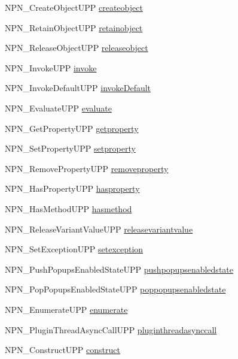 \begin{DoxyCompactItemize}
NPN\_\-CreateObjectUPP \hyperlink{struct___n_p_netscape_funcs_a92e8a72c044a7118346d278c74c5d5f7}{createobject}
\item 
NPN\_\-RetainObjectUPP \hyperlink{struct___n_p_netscape_funcs_a8bfc6725884dc636d136276a5514f972}{retainobject}
\item 
NPN\_\-ReleaseObjectUPP \hyperlink{struct___n_p_netscape_funcs_a54de30bc5da955596a5d9b7e906ec379}{releaseobject}
\item 
NPN\_\-InvokeUPP \hyperlink{struct___n_p_netscape_funcs_a35679bfb5cc423fb174de970cd7a6c33}{invoke}
\item 
NPN\_\-InvokeDefaultUPP \hyperlink{struct___n_p_netscape_funcs_a5635ae6c76d3886e8a016b6a4cbc8fb9}{invokeDefault}
\item 
NPN\_\-EvaluateUPP \hyperlink{struct___n_p_netscape_funcs_ad585928d0f332de3f0193e8bf5f4a5a6}{evaluate}
\item 
NPN\_\-GetPropertyUPP \hyperlink{struct___n_p_netscape_funcs_ac0f681694d72e58f5cd6c3cefee939ea}{getproperty}
\item 
NPN\_\-SetPropertyUPP \hyperlink{struct___n_p_netscape_funcs_a9dda4f053e35c4eaef4576901d7ffef8}{setproperty}
\item 
NPN\_\-RemovePropertyUPP \hyperlink{struct___n_p_netscape_funcs_a068280bbc940b066b586e61de6ee2c6a}{removeproperty}
\item 
NPN\_\-HasPropertyUPP \hyperlink{struct___n_p_netscape_funcs_aedfb4f76b683b697d87a1c0ba8c97c5d}{hasproperty}
\item 
NPN\_\-HasMethodUPP \hyperlink{struct___n_p_netscape_funcs_afcbe130a9fd1f9fbec374b28e485035a}{hasmethod}
\item 
NPN\_\-ReleaseVariantValueUPP \hyperlink{struct___n_p_netscape_funcs_a50af16220fecfff27b2ddeefd48d9637}{releasevariantvalue}
\item 
NPN\_\-SetExceptionUPP \hyperlink{struct___n_p_netscape_funcs_afb9d942fd173a2951286a811be4eab5d}{setexception}
\item 
NPN\_\-PushPopupsEnabledStateUPP \hyperlink{struct___n_p_netscape_funcs_af3a5dd5183774fce6b81d0cb0503517b}{pushpopupsenabledstate}
\item 
NPN\_\-PopPopupsEnabledStateUPP \hyperlink{struct___n_p_netscape_funcs_a4e7dab223330e0d1c8a5596d11fc4816}{poppopupsenabledstate}
\item 
NPN\_\-EnumerateUPP \hyperlink{struct___n_p_netscape_funcs_a4be53a2cf3fc4e6b487ee6ff32621fd8}{enumerate}
\item 
NPN\_\-PluginThreadAsyncCallUPP \hyperlink{struct___n_p_netscape_funcs_af08a09078a4d662d344fd294124b80f5}{pluginthreadasynccall}
\item 
NPN\_\-ConstructUPP \hyperlink{struct___n_p_netscape_funcs_a30e9cb377bb00c30c605e5abfddf71f9}{construct}
\end{DoxyCompactItemize}


